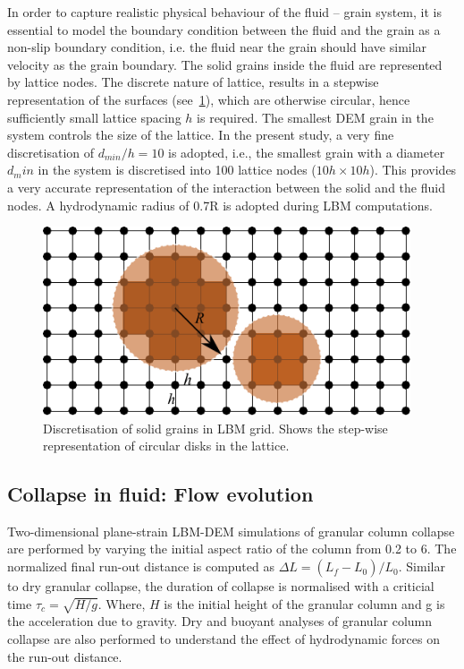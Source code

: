 In order to capture realistic physical behaviour of the fluid – grain system, 
it is essential to model the boundary condition between the fluid and the grain 
as a non-slip boundary condition, i.e. the fluid near the grain should have 
similar velocity as the grain boundary. The solid grains inside the fluid are 
represented by lattice nodes. The discrete nature of lattice, results in a 
stepwise representation of the surfaces (see~\cref{fig:LBM-DEM}), which are 
otherwise circular, hence sufficiently small lattice spacing $h$ is required. 
The smallest DEM grain in the system controls the size of the lattice. In the 
present study, a very fine discretisation of $d_{min}/h = 10$ is adopted, 
i.e., the smallest grain with a diameter $d_min$ in the system is discretised 
into 100 lattice nodes ($ 10h \times 10h$). This provides a very accurate 
representation of the interaction between the solid and the fluid nodes.  A 
hydrodynamic radius of 0.7R is adopted during LBM computations. 

\begin{figure}[htpb]
\centering
\includegraphics[width=0.97\textwidth]{LBM-DEM}
\caption{Discretisation of solid grains in LBM grid. Shows the step-wise 
representation of circular disks in the lattice.}
\label{fig:LBM-DEM}
\end{figure}


\subsection{Collapse in fluid: Flow evolution}
\label{sec:collapse_fluid_evolution}
Two-dimensional plane-strain LBM-DEM simulations of granular column 
collapse are performed by varying the initial aspect ratio of the column from 
0.2 to 6. The normalized final run-out distance is computed as $\Delta L = 
(L_{\textit{f}}-L_{\textit{0}})/L_{\textit{0}}$. Similar to dry granular 
collapse, the duration of collapse is normalised with a criticial time $\tau_c 
= \sqrt{H/g}$. Where, $H$ is the initial height of the granular column and g is 
the acceleration due to gravity.  Dry and buoyant analyses of granular column 
collapse are also performed to understand the effect of hydrodynamic forces on 
the run-out distance.

